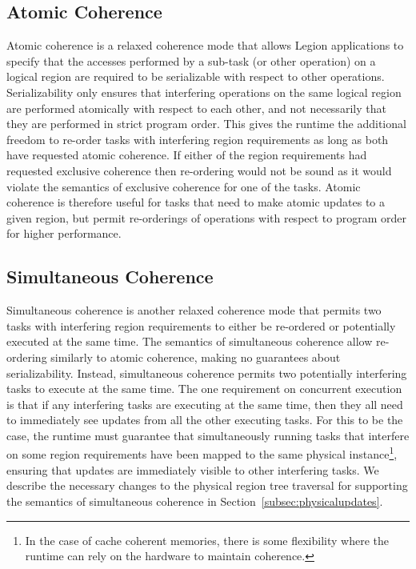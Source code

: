 \subsection{Atomic Coherence}
\label{subsec:atomic}
Atomic coherence is a relaxed coherence mode that
allows Legion applications to specify that the 
accesses performed by a sub-task (or other operation)
on a logical region are required to be serializable
with respect to other operations. Serializability 
only ensures that interfering operations on the
same logical region are performed atomically with 
respect to each other, and not necessarily that they 
are performed in strict program order. This gives the
runtime the additional freedom to re-order tasks with 
interfering region requirements as long as both have 
requested atomic coherence. If either of the region 
requirements had requested exclusive coherence then 
re-ordering would not be sound as it would violate 
the semantics of exclusive coherence for one of the 
tasks. Atomic coherence is therefore useful for tasks 
that need to make atomic updates to a given region,
but permit re-orderings of operations with respect
to program order for higher performance. 

\subsection{Simultaneous Coherence}
\label{subec:simultaneous}
Simultaneous coherence is another relaxed coherence
mode that permits two tasks with interfering region
requirements to either be re-ordered or potentially
executed at the same time. The semantics of simultaneous
coherence allow re-ordering similarly to atomic coherence, 
making no guarantees about serializability. Instead,
simultaneous coherence permits two potentially 
interfering tasks to execute at the same time.
The one requirement on concurrent execution is that if
any interfering tasks are executing at the same time,
then they all need to immediately see updates from 
all the other executing tasks. For this to be
the case, the runtime must guarantee that simultaneously
running tasks that interfere on some region requirements
have been mapped to the same physical instance\footnote{
In the case of cache coherent memories, there is some
flexibility where the runtime can rely on the hardware
to maintain coherence.}, ensuring that updates are 
immediately visible to other interfering tasks. We describe 
the necessary changes to the physical region tree traversal 
for supporting the semantics of simultaneous coherence
in Section~\ref{subsec:physicalupdates}.

